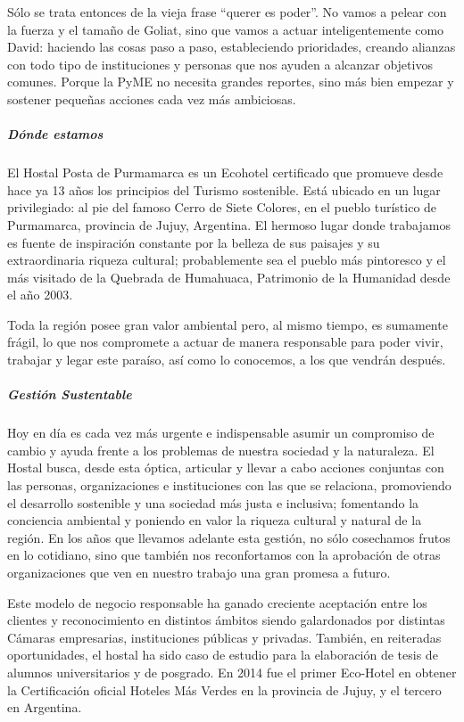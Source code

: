 \documentclass[
]{article}
\begin{document}
Sólo se trata entonces de la vieja frase ``querer es poder''. No vamos a
pelear con la fuerza y el tamaño de Goliat, sino que vamos a actuar
inteligentemente como David: haciendo las cosas paso a paso,
estableciendo prioridades, creando alianzas con todo tipo de
instituciones y personas que nos ayuden a alcanzar objetivos comunes.
Porque la PyME no necesita grandes reportes, sino más bien empezar y
sostener pequeñas acciones cada vez más ambiciosas.

\hypertarget{duxf3nde-estamos}{%
\subparagraph{Dónde estamos}\label{duxf3nde-estamos}}

El Hostal Posta de Purmamarca es un Ecohotel certificado que promueve
desde hace ya 13 años los principios del Turismo sostenible. Está
ubicado en un lugar privilegiado: al pie del famoso Cerro de Siete
Colores, en el pueblo turístico de Purmamarca, provincia de Jujuy,
Argentina. El hermoso lugar donde trabajamos es fuente de inspiración
constante por la belleza de sus paisajes y su extraordinaria riqueza
cultural; probablemente sea el pueblo más pintoresco y el más visitado
de la Quebrada de Humahuaca, Patrimonio de la Humanidad desde el año
2003.

Toda la región posee gran valor ambiental pero, al mismo tiempo, es
sumamente frágil, lo que nos compromete a actuar de manera responsable
para poder vivir, trabajar y legar este paraíso, así como lo conocemos,
a los que vendrán después.

\hypertarget{gestiuxf3n-sustentable}{%
\subparagraph{Gestión Sustentable}\label{gestiuxf3n-sustentable}}

Hoy en día es cada vez más urgente e indispensable asumir un compromiso
de cambio y ayuda frente a los problemas de nuestra sociedad y la
naturaleza. El Hostal busca, desde esta óptica, articular y llevar a
cabo acciones conjuntas con las personas, organizaciones e instituciones
con las que se relaciona, promoviendo el desarrollo sostenible y una
sociedad más justa e inclusiva; fomentando la conciencia ambiental y
poniendo en valor la riqueza cultural y natural de la región. En los
años que llevamos adelante esta gestión, no sólo cosechamos frutos en lo
cotidiano, sino que también nos reconfortamos con la aprobación de otras
organizaciones que ven en nuestro trabajo una gran promesa a futuro.

Este modelo de negocio responsable ha ganado creciente aceptación entre
los clientes y reconocimiento en distintos ámbitos siendo galardonados
por distintas Cámaras empresarias, instituciones públicas y privadas.
También, en reiteradas oportunidades, el hostal ha sido caso de estudio
para la elaboración de tesis de alumnos universitarios y de posgrado. En
2014 fue el primer Eco-Hotel en obtener la Certificación oficial Hoteles
Más Verdes en la provincia de Jujuy, y el tercero en Argentina.
\end{document}
